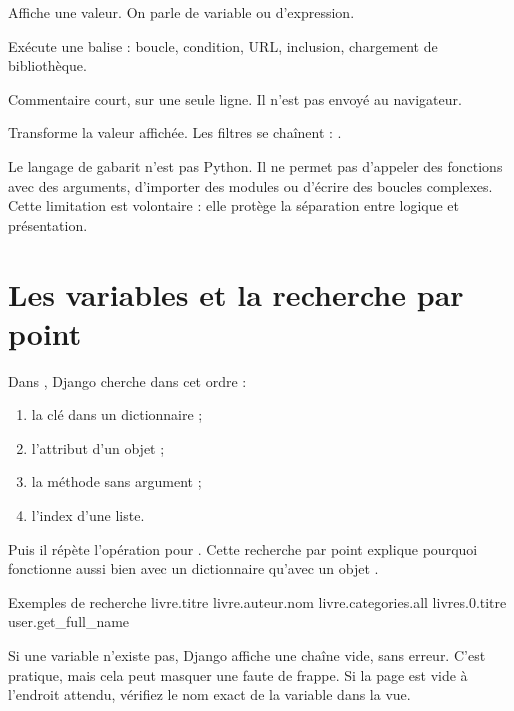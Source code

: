 \begin{description}[leftmargin=3.2cm,style=nextline]
  \item[\code{\{\{ ... \}\}}] Affiche une valeur. On parle de variable ou
  d'expression.
  \item[\code{\{\% ... \%\}}] Exécute une balise : boucle, condition, URL,
  inclusion, chargement de bibliothèque.
  \item[\code{\{\# ... \#\}}] Commentaire court, sur une seule ligne. Il n'est pas
  envoyé au navigateur.
  \item[\code{|filtre}] Transforme la valeur affichée. Les filtres se chaînent :
  .
\end{description}

\begin{retenir}
Le langage de gabarit n'est pas Python. Il ne permet pas d'appeler des fonctions
avec des arguments, d'importer des modules ou d'écrire des boucles complexes.
Cette limitation est volontaire : elle protège la séparation entre logique et
présentation.
\end{retenir}

\section{Les variables et la recherche par point}

Dans , Django cherche dans cet ordre :
\begin{enumerate}
  \item la clé  dans un dictionnaire ;
  \item l'attribut  d'un objet ;
  \item la méthode  sans argument ;
  \item l'index  d'une liste.
\end{enumerate}

Puis il répète l'opération pour . Cette recherche par point explique
pourquoi  fonctionne aussi bien avec un dictionnaire
qu'avec un objet .

\begin{codebox}[html]{Exemples de recherche}
{{ livre.titre }}
{{ livre.auteur.nom }}
{{ livre.categories.all }}
{{ livres.0.titre }}
{{ user.get_full_name }}
\end{codebox}

\begin{attention}
Si une variable n'existe pas, Django affiche une chaîne vide, sans erreur. C'est
pratique, mais cela peut masquer une faute de frappe. Si la page est vide à
l'endroit attendu, vérifiez le nom exact de la variable dans la vue.
\end{attention}

